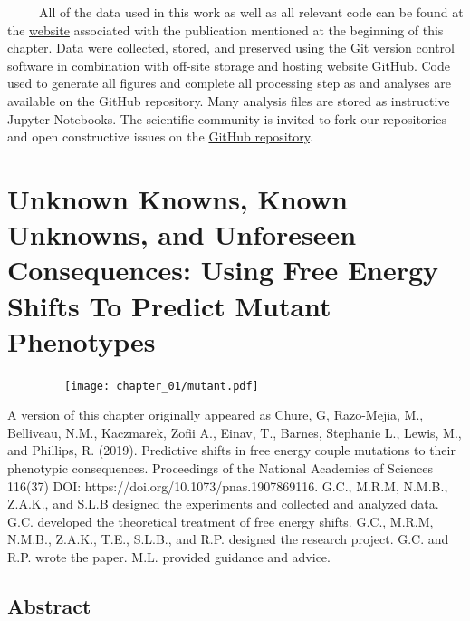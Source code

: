 \documentclass[12pt]{caltech_thesis}
\begin{document}
~~~~~All of the data used in this work as well as all relevant code can
be found at the
\href{http://rpgroup-pboc.github.io/mwc_induction}{website} associated
with the publication mentioned at the beginning of this chapter. Data
were collected, stored, and preserved using the Git version control
software in combination with off-site storage and hosting website
GitHub. Code used to generate all figures and complete all processing
step as and analyses are available on the GitHub repository. Many
analysis files are stored as instructive Jupyter Notebooks. The
scientific community is invited to fork our repositories and open
constructive issues on the
\href{https://www.github.com/rpgroup-pboc/mwc_induction}{GitHub
repository}.

\hypertarget{unknown-knowns-known-unknowns-and-unforeseen-consequences-using-free-energy-shifts-to-predict-mutant-phenotypes}{%
\chapter{Unknown Knowns, Known Unknowns, and Unforeseen Consequences:
Using Free Energy Shifts To Predict Mutant
Phenotypes}\label{unknown-knowns-known-unknowns-and-unforeseen-consequences-using-free-energy-shifts-to-predict-mutant-phenotypes}}

~~~~~~~~~\texttt{[image: chapter\_01/mutant.pdf]}

A version of this chapter originally appeared as Chure, G, Razo-Mejia,
M., Belliveau, N.M., Kaczmarek, Zofii A., Einav, T., Barnes, Stephanie
L., Lewis, M., and Phillips, R. (2019). Predictive shifts in free energy
couple mutations to their phenotypic consequences. Proceedings of the
National Academies of Sciences 116(37) DOI:
https://doi.org/10.1073/pnas.1907869116. G.C., M.R.M, N.M.B., Z.A.K.,
and S.L.B designed the experiments and collected and analyzed data. G.C.
developed the theoretical treatment of free energy shifts. G.C., M.R.M,
N.M.B., Z.A.K., T.E., S.L.B., and R.P. designed the research project.
G.C. and R.P. wrote the paper. M.L. provided guidance and advice.

\hypertarget{abstract-1}{%
\section{Abstract}\label{abstract-1}}
\end{document}
